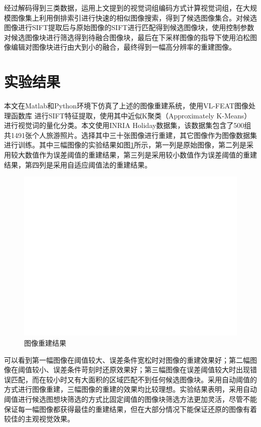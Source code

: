 \documentclass[UTF8]{csoarticle}
\begin{document}
经过解码得到三类数据，运用上文提到的视觉词组编码方式计算视觉词组，在大规模图像集上利用倒排索引进行快速的相似图像搜索，得到了候选图像集合。对候选图像进行SIFT提取后与原始图像的SIFT进行匹配得到候选图像块，使用控制参数对候选图像块进行筛选得到待融合图像块，最后在下采样图像的指导下使用泊松图像编辑对图像块进行由大到小的融合，最终得到一幅高分辨率的重建图像。

\section{实验结果}
本文在Matlab和Python环境下仿真了上述的图像重建系统，使用VL-FEAT图像处理函数库
进行SIFT特征提取，使用其中近似K聚类（Approximately K-Means）进行视觉词的量化分类。本文使用INRIA Holiday数据集，该数据集包含了500组共1491张个人旅游照片。选择其中三十张图像进行重建，其它图像作为图像数据集进行训练。其中三幅图像的实验结果如图\ref{fig:result}所示，第一列是原始图像，第二列是采用较大数值作为误差阈值的重建结果，第三列是采用较小数值作为误差阈值的重建结果，第四列是采用自适应阈值法的重建结果。

\begin{figure}
\centering\includegraphics[width=15cm]{rec_result}
\caption{图像重建结果}
\label{fig:result}
\end{figure}

可以看到第一幅图像在阈值较大、误差条件宽松时对图像的重建效果好；第二幅图像在阈值较小、误差条件苛刻时还原效果好；第三幅图像在误差阈值较大时出现错误匹配，而在较小时又有大面积的区域匹配不到任何候选图像块。采用自动阈值的方式进行图像重建，三幅图像的重建的效果均比较理想。实验结果表明，采用自动阈值进行候选图想块筛选的方式比固定阈值的图像块筛选方法更加灵活，尽管不能保证每一幅图像都获得最佳的重建结果，但在大部分情况下能保证还原的图像有着较佳的主观视觉效果。
\end{document}
